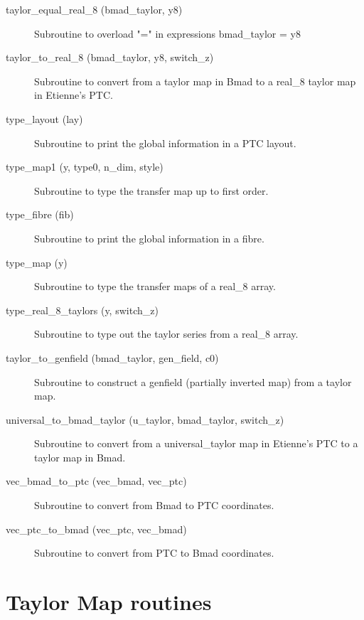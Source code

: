 \begin{description}
\item[taylor\_equal\_real\_8 (bmad\_taylor, y8)] \Newline
Subroutine to overload "=" in expressions bmad\_taylor = y8 

\item[taylor\_to\_real\_8 (bmad\_taylor, y8, switch\_z)] \Newline
Subroutine to convert from a taylor map in Bmad to a real\_8 taylor map in Etienne's PTC. 

\item[type\_layout (lay)] \Newline
Subroutine to print the global information in a PTC layout.

\item[type\_map1 (y, type0, n\_dim, style)] \Newline
Subroutine to type the transfer map up to first order. 

\item[type\_fibre (fib)] \Newline
Subroutine to print the global information in a fibre.

\item[type\_map (y)] \Newline
Subroutine to type the transfer maps of a real\_8 array. 

\item[type\_real\_8\_taylors (y, switch\_z)] \Newline
Subroutine to type out the taylor series from a real\_8 array. 

\item[taylor\_to\_genfield (bmad\_taylor, gen\_field, c0)] \Newline
Subroutine to construct a genfield (partially inverted map) from a taylor map. 

\item[universal\_to\_bmad\_taylor (u\_taylor, bmad\_taylor, switch\_z)] \Newline
Subroutine to convert from a universal\_taylor map in Etienne's PTC to a taylor map in Bmad. 

\item[vec\_bmad\_to\_ptc (vec\_bmad, vec\_ptc)] \Newline
Subroutine to convert from Bmad to PTC coordinates. 

\item[vec\_ptc\_to\_bmad (vec\_ptc, vec\_bmad)] \Newline
Subroutine to convert from PTC to Bmad coordinates. 

\end{description}

\section{Taylor Map routines}
\label{r:taylor}   


